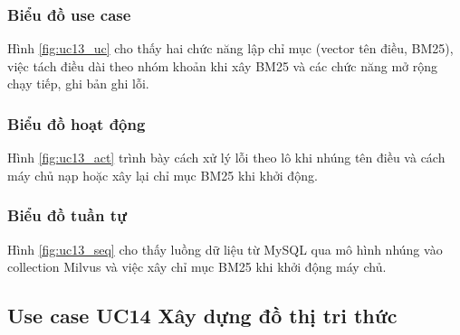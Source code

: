 \documentclass[../DoAn.tex]{subfiles}
\begin{document}
\subsubsection{Biểu đồ use case}
Hình \ref{fig:uc13_uc} cho thấy hai chức năng lập chỉ mục (vector tên điều, BM25), việc tách điều dài theo nhóm khoản khi xây BM25 và các chức năng mở rộng chạy tiếp, ghi bản ghi lỗi.


\subsubsection{Biểu đồ hoạt động}
Hình \ref{fig:uc13_act} trình bày cách xử lý lỗi theo lô khi nhúng tên điều và cách máy chủ nạp hoặc xây lại chỉ mục BM25 khi khởi động.


\subsubsection{Biểu đồ tuần tự}
Hình \ref{fig:uc13_seq} cho thấy luồng dữ liệu từ MySQL qua mô hình nhúng vào collection Milvus và việc xây chỉ mục BM25 khi khởi động máy chủ.



\subsection{Use case UC14 Xây dựng đồ thị tri thức}
\label{subsection:uc14}
\end{document}
